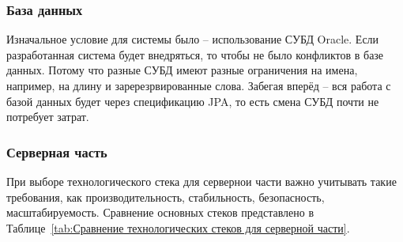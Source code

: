\documentclass[a4paper,article]{article}
\begin{document}
    \subsubsection{База данных}\label{Реализация. Выбор. База данных}

    Изначальное условие для системы было -- использование СУБД Oracle. Если разработанная система будет внедряться, то чтобы не было конфликтов в базе данных. Потому что разные СУБД имеют разные ограничения на имена, например, на длину и заререзрвированные слова. Забегая вперёд -- вся работа с базой данных будет через спецификацию JPA, то есть смена СУБД почти не потребует затрат.

    \newpage

    \subsubsection{Серверная часть}\label{Реализация. Выбор. Серверная часть}

    При выборе технологического стека для сервернои части важно учитывать такие требования, как производительность, стабильность, безопасность, масштабируемость. Сравнение основных стеков представлено в Таблице~\ref{tab:Сравнение технологических стеков для серверной части}.
\end{document}
